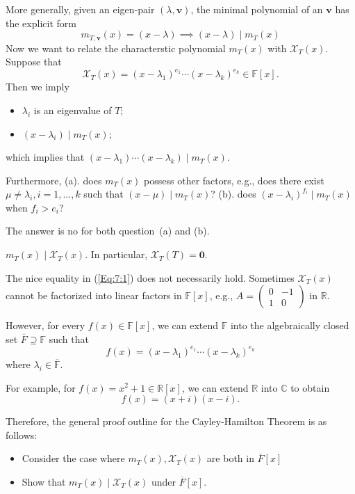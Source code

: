 \begin{remark}
More generally, given an eigen-pair $(\lambda,\bm v)$, the minimal polynomial of an $\bm v$ has the explicit form
\[
m_{T,\bm v}(x) =  (x-\lambda)\implies
(x-\lambda)\mid m_T(x)
\]
Now we want to relate the characterstic polynomial $m_T(x)$ with $\mathcal{X}_T(x)$.
Suppose that
\begin{equation}\label{Eq:7:1}
\mathcal{X}_T(x) = (x-\lambda_1)^{e_1}\cdots(x-\lambda_k)^{e_k}\in\mathbb{F}[x].
\end{equation}
Then we imply
\begin{itemize}
\item
$\lambda_i$ is an eigenvalue of $T$;
\item
$(x-\lambda_i)\mid m_T(x)$;
\end{itemize}
which implies that $(x-\lambda_1)\cdots(x-\lambda_k)\mid m_T(x)$.

Furthermore, (a). does $m_T(x)$ possess other factors, e.g., does there exist $\mu\ne\lambda_i, i=1,\dots,k$ such that $(x-\mu)\mid m_T(x)$?
(b). does $(x-\lambda_i)^{f_i}\mid m_T(x)$ when $f_i>e_i$?

The answer is no for both question~(a) and (b).
\end{remark}
\begin{theorem}
$m_T(x)\mid\mathcal{X}_T(x)$. In particular, $\mathcal{X}_T(T)=\bm0$.
\end{theorem}
The nice equality in (\ref{Eq:7:1}) does not necessarily hold. 
Sometimes $\mathcal{X}_{T}(x)$ cannot be factorized into linear factors in $\mathbb{F}[x]$, e.g., $A=\begin{pmatrix}
0&-1\\1&0
\end{pmatrix}$ in $\mathbb{R}$.

However, for every $f(x)\in\mathbb{F}[x]$, we can extend $\mathbb{F}$ into the algebraically closed set $\overline{F}\supseteq\mathbb{F}$ such that
\[
f(x) = (x-\lambda_1)^{e_1}\cdots(x-\lambda_k)^{e_k}
\]
where $\lambda_i\in\overline{\mathbb{F}}$.

For example, for $f(x) = x^2+1\in\mathbb{R}[x]$, we can extend $\mathbb{R}$ into $\mathbb{C}$ to obtain
\[
f(x) = (x+i)(x-i).
\]

Therefore, the general proof outline for the Cayley-Hamilton Theorem is as follows:
\begin{itemize}
\item
Consider the case where $m_T(x),\mathcal{X}_T(x)$ are both in $\overline{F}[x]$
\item
Show that $m_T(x)\mid\mathcal{X}_T(x)$ under $\overline{F}[x]$.
\end{itemize}

